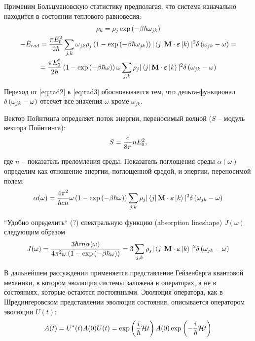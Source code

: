 Применим Больцмановскую статистику предполагая, что система изначально находится в состоянии теплового равновесия:
\vverh
\begin{gather}
	\rho_k = \rho_j \exp \left( - \beta \hbar \omega_{jk} \right) \notag \\
	- \dot{E}_{rad} = \frac{\pi E_0^2}{2 \hbar} \sum_{j, k} \omega_{jk} \rho_j \left( 1 - \exp \left( - \beta \hbar \omega_{jk} \right) \right) | \bra{j} \mathbf{M} \cdot \boldsymbol{\varepsilon} \ket{k} |^2 \delta \left( \omega_{jk} - \omega \right) = \label{eq:rad2} \\
	= \frac{\pi E_0^2}{2 \hbar} \left( 1 - \exp \left( - \beta \hbar \omega \right) \right) \omega \sum_{j, k} \rho_j | \bra{j} \mathbf{M} \cdot \boldsymbol{\varepsilon} \ket{k} |^2 \delta \left( \omega_{jk} - \omega \right) \label{eq:rad3} 
\end{gather}

Переход от \ref{eq:rad2} к \ref{eq:rad3} обосновывается тем, что дельта-функционал $\delta \left( \omega_{jk} - \omega \right)$ отсечет все значения $\omega$ кроме $\omega_{jk}$.  

Вектор Пойнтинга определяет поток энергии, переносимый волной ($S$ -- модуль вектора Пойнтинга):
\vverh
\begin{gather}
	S = \frac{c}{8 \pi} n E_0^2, \notag
\end{gather}

где $n$ -- показатель преломления среды. Показатель поглощения среды $\alpha(\omega)$ определим как отношение энергии, поглощенной средой, и энергии, переносимой полем:
\vverh
\begin{gather}
	\alpha(\omega) = \frac{4 \pi^2}{\hbar c n} \omega \left( 1 - \exp \left( - \beta \hbar \omega \right) \right) \sum_{j, k} \rho_j | \bra{j} \mathbf{M} \cdot \boldsymbol{\varepsilon} \ket{k} |^2 \delta \left( \omega_{jk} - \omega \right) \notag
\end{gather}

``Удобно определить`` (?) спектральную функцию (absorption lineshape) $J(\omega)$ следующим образом  
\vverh
\begin{gather}
	J(\omega) = \frac{3 \hbar c n \alpha(\omega)}{4 \pi^2 \omega \left( 1 - \exp \left( - \beta \hbar \omega \right) \right)} = 3 \sum_{j, k} \rho_j | \bra{j} \mathbf{M} \cdot \boldsymbol{\varepsilon} \ket{k} |^2 \delta \left( \omega_{jk} - \omega \right) \label{eq:specfunc} 
\end{gather}

В дальнейшем рассуждении применяется представление Гейзенберга квантовой механики, в котором эволюция системы заложена в операторах, а не в состояниях, которые остаются постоянными. Эволюция оператора, как в Шредингеровском представлении эволюция состояния, описывается оператором эволюции $U(t)$:
\vverh
\begin{gather}
	A(t) = U^{*}(t) A(0) U(t) = \exp \left( \frac{i}{\hbar} \mathcal{H} t \right) A(0) \exp \left( - \frac{i}{\hbar} \mathcal{H} t \right) \notag
\end{gather}

